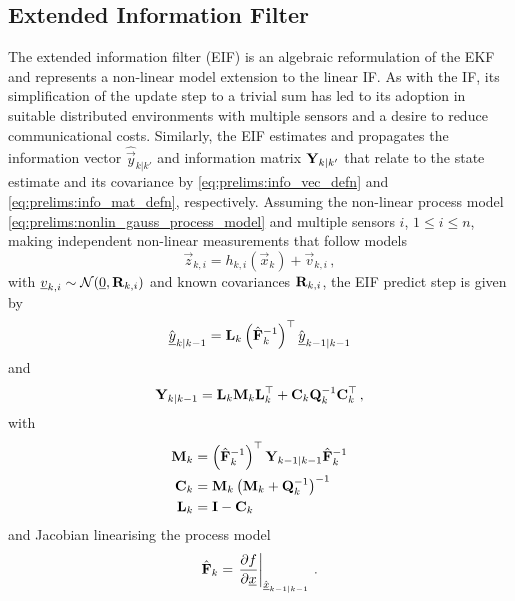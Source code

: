 % 
% 

\subsection{Extended Information Filter}
The extended information filter (EIF) is an algebraic reformulation of the EKF and represents a non-linear model extension to the linear IF. As with the IF, its simplification of the update step to a trivial sum has led to its adoption in suitable distributed environments with multiple sensors and a desire to reduce communicational costs. Similarly, the EIF estimates and propagates the information vector $\hat{\vec{y}}_{k|k'}$ and information matrix ${{\mathbf{Y}}}_{k|k'}$ that relate to the state estimate and its covariance by \eqref{eq:prelims:info_vec_defn} and \eqref{eq:prelims:info_mat_defn}, respectively. Assuming the non-linear process model \eqref{eq:prelims:nonlin_gauss_process_model} and multiple sensors $i$, $1\leq i \leq n$, making independent non-linear measurements that follow models
\begin{equation}
    \vec{z}_{k,i} = h_{k,i}\left(\vec{x}_k\right) + \vec{v}_{k,i}\,,
\end{equation}
with ${\underline{v}}_{k,i}\sim\mathcal{N}({\underline{0}},{{\mathbf{R}}}_{k,i})$ and known covariances ${{\mathbf{R}}}_{k,i}$, the EIF predict step is given by
\begin{equation}\label{eq:prelims:eif_info_vec_predict}
    \hat{{\underline{y}}}_{k|k-1} = {{\mathbf{L}}}_k\left(\hat{{{\mathbf{F}}}}_k^{-1}\right)^\top\hat{{\underline{y}}}_{k-1|k-1}
\end{equation}
and
\begin{equation}\label{eq:prelims:eif_info_mat_predict}
    {\ensuremath{{\mathbf{Y}}}}_{k|k-1} = {{\mathbf{L}}}_k{{\mathbf{M}}}_k{{\mathbf{L}}}_k^\top + {{\mathbf{C}}}_k{{\mathbf{Q}}}_k^{-1}{{\mathbf{C}}}_k^\top\,,
\end{equation}
with
\begin{align}
    {\ensuremath{{\mathbf{M}}}}_k &= \left(\hat{{{\mathbf{F}}}}_k^{-1}\right)^\top{\ensuremath{{\mathbf{Y}}}}_{k-1|k-1}\hat{{{\mathbf{F}}}}_k^{-1}\\
    {{\mathbf{C}}}_k &= {{\mathbf{M}}}_k\left({{\mathbf{M}}}_k + {{\mathbf{Q}}}_k^{-1}\right)^{-1}\\
    {{\mathbf{L}}}_k &= {{\mathbf{I}}} - {{\mathbf{C}}}_k
\end{align}
and Jacobian linearising the process model
\begin{equation}
    \hat{{{\mathbf{F}}}}_k = \left.\frac{\partial f}{\partial {\underline{x}}}\right|_{\hat{{\underline{x}}}_{k-1|k-1}}\,.
\end{equation}
